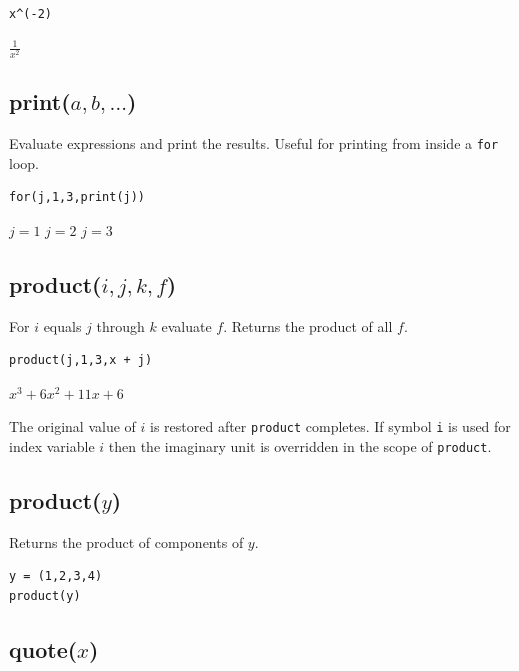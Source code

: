\documentclass[12pt]{article}
\begin{document}
{\color{blue}
\begin{verbatim}
x^(-2)
\end{verbatim}
}

\noindent
$\displaystyle \frac{1}{x^2}$

\subsection*{print($a,b,\ldots$)}

Evaluate expressions and print the results.
Useful for printing from inside a {\tt for} loop.

{\color{blue}
\begin{verbatim}
for(j,1,3,print(j))
\end{verbatim}
}

\noindent
$j=1$\newline
$j=2$\newline
$j=3$

\subsection*{product($i,j,k,f$)}

For $i$ equals $j$ through $k$ evaluate $f$.
Returns the product of all $f$.

{\color{blue}
\begin{verbatim}
product(j,1,3,x + j)
\end{verbatim}
}

\noindent
$\displaystyle x^3+6x^2+11x+6$

\bigskip
\noindent
The original value of $i$ is restored after {\tt product} completes.
If symbol {\tt i} is used for index variable $i$
then the imaginary unit is overridden in the scope of {\tt product}.

\subsection*{product($y$)}

Returns the product of components of $y$.

{\color{blue}
\begin{verbatim}
y = (1,2,3,4)
product(y)
\end{verbatim}
}


\subsection*{quote($x$)}
\end{document}
